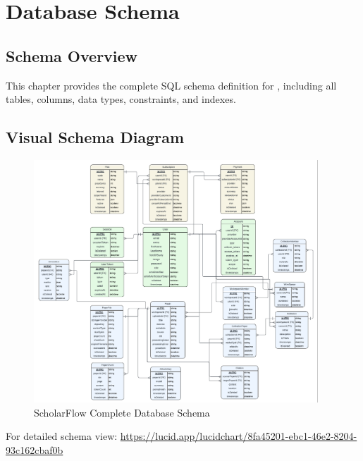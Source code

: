 \chapter{Database Schema}
\label{ch:database-schema}

\section{Schema Overview}
\label{sec:schema-overview}

This chapter provides the complete SQL schema definition for \projectname{}, including all tables, columns, data types, constraints, and indexes.

\section{Visual Schema Diagram}
\label{sec:schema-diagram}

\begin{figure}[H]
\centering
\includegraphics[width=0.95\textwidth]{images/diagrams/schema.png}
\caption{ScholarFlow Complete Database Schema}
\label{fig:schema-complete}
\end{figure}

\noindent For detailed schema view: \url{https://lucid.app/lucidchart/8fa45201-ebc1-46e2-8204-93c162cbaf0b}

